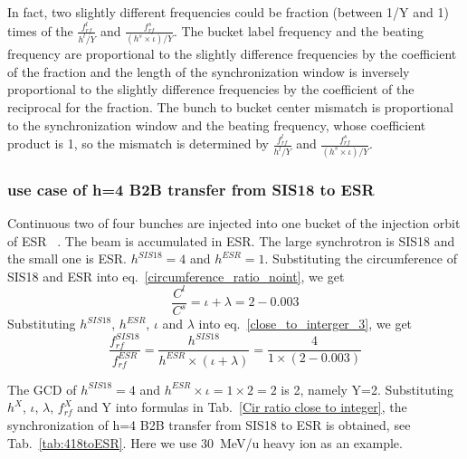 In fact, two slightly different frequencies could be fraction (between 1/Y and 1) times of the $\frac{f_{rf}^{l}}{h^l/Y}$ and $\frac{f_{rf}^{s}}{(h^s\times \iota)/Y}$. The bucket label frequency and the beating frequency are proportional to the slightly difference frequencies by the coefficient of the fraction and the length of the synchronization window is inversely proportional to the slightly difference frequencies by the coefficient of the reciprocal for the fraction. The bunch to bucket center mismatch is proportional to the synchronization window and the beating frequency, whose coefficient product is 1, so the mismatch is determined by $\frac{f_{rf}^{l}}{h^l/Y}$ and $\frac{f_{rf}^{s}}{(h^s\times \iota)/Y}$.

\subsubsection{use case of h=4 B2B transfer from SIS18 to ESR} 
Continuous two of four bunches are injected into one bucket of the injection orbit of ESR ~\cite{steck_demonstration_2011}. The beam is accumulated in ESR. The large synchrotron is SIS18 and the small one is ESR. $h^{SIS18}=4$ and $h^{ESR}=1$. Substituting the circumference of SIS18 and ESR into eq.~\ref{circumference_ratio_noint}, we get
\begin{equation}
\frac{C^l}{C^s}=\iota + \lambda =2-0.003
\end{equation}
Substituting $h^{SIS18}$, $h^{ESR}$, $\iota$ and $\lambda$ into eq.~\ref{close_to_interger_3}, we get
\begin{equation}
\frac {f_{rf}^{SIS18}}{f_{rf}^{ESR}}= \frac{h^{SIS18}}{h^{ESR} \times (\iota+ \lambda)}=\frac {4}{1 \times(2-0.003)}
\end{equation}

The GCD of $h^{SIS18}=4$ and $h^{ESR}\times \iota=1\times 2=2$ is 2, namely Y=2. Substituting $h^X$, $\iota$, $\lambda$, $f_{rf}^{X}$ and Y into formulas in Tab.~\ref{Cir ratio close to integer}, the synchronization of h=4 B2B transfer from SIS18 to ESR is obtained, see Tab.~\ref{tab:418toESR}. Here we use \SI{30}{MeV/\atomicmassunit} heavy ion as an example. 


